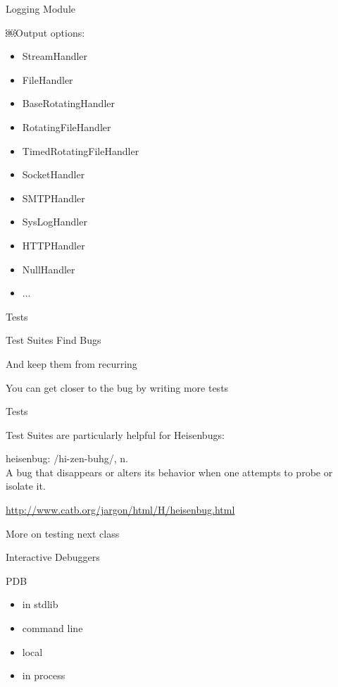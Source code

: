 \documentclass{beamer}
\begin{document}
\begin{frame}[fragile]{Logging Module}

{\LARGE ￼Output options:}

\vfill
\begin{itemize}
\item StreamHandler 
\item FileHandler 
\item BaseRotatingHandler 
\item RotatingFileHandler 
\item TimedRotatingFileHandler 
\item SocketHandler 
\item SMTPHandler 
\item SysLogHandler 
\item HTTPHandler 
\item NullHandler 
\item ...
\end{itemize}

\end{frame} 


\begin{frame}[fragile]{Tests}

{\LARGE Test Suites Find Bugs}

\vfill
{\LARGE And keep them from recurring}

\vfill
{\LARGE You can get closer to the bug by writing more tests}

\end{frame} 

\begin{frame}[fragile]{Tests}

{\LARGE Test Suites are particularly helpful for Heisenbugs:}

\vfill
heisenbug: /hi-zen-buhg/, n.\\[0.1in]
A bug that disappears or alters its behavior when one attempts to probe or isolate it.

\vfill
\url{http://www.catb.org/jargon/html/H/heisenbug.html}

\vfill
{\Large More on testing next class}

\end{frame} 


\begin{frame}[fragile]{Interactive Debuggers}

{\LARGE PDB}

\vfill
{\Large
\begin{itemize}
\item in stdlib
\item command line
\item local
\item in process
\end{itemize}
}

\end{frame} 
\end{document}
